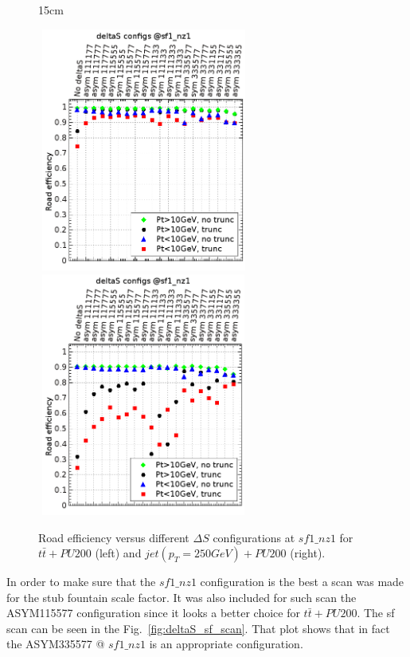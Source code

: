 \begin{figure}[htbp]{15cm}
	\caption{Road efficiency versus different $\Delta S$ configurations at $sf1\_nz1$ for $t\bar{t}+PU200$ (left) and $jet(p_{T}=250GeV)+PU200$ (right).}
	\centering
	\includegraphics[width=7cm,height=8cm]{AppendixCMSL1TT/figs/final_plots/ttbar_pu200_pt_split_graph}
	\includegraphics[width=7cm,height=8cm]{AppendixCMSL1TT/figs/final_plots/jet250_pu200_pt_split_graph}
	\label{fig:deltaS_trunc_eff}
\end{figure}

In order to make sure that the $sf1\_nz1$ configuration is the best a scan was made for the stub fountain scale factor. It was also included for such scan the ASYM115577 configuration since it looks a better choice for $t\bar{t}+PU200$. The sf scan can be seen in the Fig.~\ref{fig:deltaS_sf_scan}. That plot shows that in fact the ASYM335577 @ $sf1\_nz1$ is an appropriate configuration.

